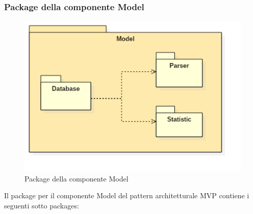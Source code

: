 \subsubsection{Package della componente Model}
	\begin{figure}[h!]
	\begin{center}
		\includegraphics[scale=0.65]{../images/ModelPackage.png}
		\caption{Package della componente Model}
	\end{center}
	\end{figure}
	Il package per il componente Model del pattern architetturale MVP contiene i seguenti sotto packages:
